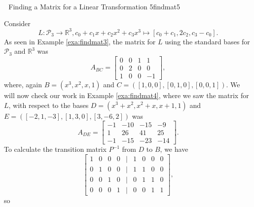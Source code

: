         \begin{example}{\Difficulty\,\Difficulty\,\Difficulty\,\,Finding a Matrix for a Linear Transformation 5}{findmat5}
            
            Consider
            \begin{equation*}
                L:\mathcal{P}_3\to\mathbb{R}^3, c_0+c_1x+c_2x^2+c_3x^3\mapsto[c_0+c_1,2c_2,c_3-c_0].
            \end{equation*}
            As seen in Example \ref{exa:findmat3}, the matrix for \(L\) using the standard bases for \(\mathcal{P}_3\) and \(\mathbb{R}^3\) was
            \begin{equation*}
                A_{BC}=\begin{bmatrix}
                    0 & 0 & 1 & 1 \\
                    0 & 2 & 0 & 0 \\
                    1 & 0 & 0 & -1
                \end{bmatrix},
            \end{equation*}
            where, again \(B=(x^3,x^2,x,1)\) and \(C=([1,0,0],[0,1,0],[0,0,1])\). We will now check our work in Example \ref{exa:findmat4}, where we saw the matrix for \(L\), with respect to the bases \(D=(x^3+x^2,x^2+x,x+1,1)\) and \(E=([-2,1,-3],[1,3,0],[3,-6,2])\) was
            \begin{equation*}
                A_{DE}=\begin{bmatrix}
                    -1 & -10 & -15 & -9 \\
                    1 & 26 & 41 & 25 \\
                    -1 & -15 & -23 & -14
                \end{bmatrix}.
            \end{equation*}
            To calculate the transition matrix \(P^{-1}\) from \(D\) to \(B\), we have
            \begin{equation*}
                \begin{bmatrix}
                    1 & 0 & 0 & 0 & | & 1 & 0 & 0 & 0 \\
                    0 & 1 & 0 & 0 & | & 1 & 1 & 0 & 0 \\
                    0 & 0 & 1 & 0 & | & 0 & 1 & 1 & 0 \\
                    0 & 0 & 0 & 1 & | & 0 & 0 & 1 & 1
                \end{bmatrix},
            \end{equation*}
            so
            \begin{equation*}

\end{equation*}
\end{example}
